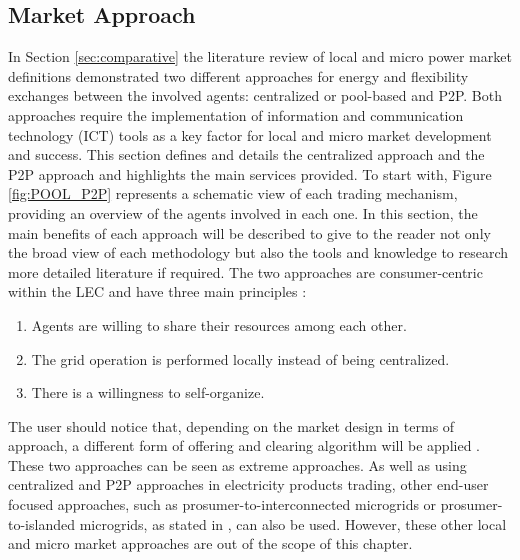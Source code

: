 \subsection{Market Approach} \label{sec:marketapproach}

In Section \ref{sec:comparative} the literature review of local and micro power market definitions demonstrated two different
approaches for energy and flexibility exchanges between the involved agents: centralized or pool-based and P2P. Both approaches require the implementation of information and communication technology (ICT) tools as a key factor for local and micro market development and success. This section defines and details the centralized approach and the P2P approach and highlights the main services provided. To start with, Figure \ref{fig:POOL_P2P} represents a schematic view of each trading mechanism, providing an overview of the agents involved in each one. In this section, the main benefits of each approach will be described to give to the reader not only the broad view of each methodology but also the tools and knowledge to research more detailed literature if required. The two approaches are consumer-centric within the LEC and have three main principles \cite{sousa2018peer}:

\begin{enumerate}
\item Agents are willing to share their resources among each other.
\item The grid operation is performed locally instead of being centralized.
\item There is a willingness to self-organize.
\end{enumerate}

The user should notice that, depending on the market design in terms of approach, a different form of offering and clearing algorithm will be applied \cite{Pinson2017}. These two approaches can be seen as extreme approaches. As well as using centralized and P2P approaches in electricity products trading, other end-user focused approaches, such as prosumer-to-interconnected microgrids or prosumer-to-islanded microgrids, as stated in \cite{parag2016electricity}, can also be used. However, these other local and micro market approaches are out of the scope of this chapter.

